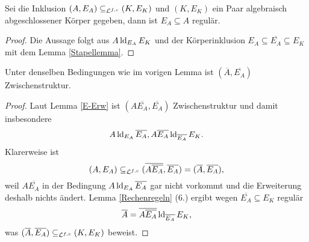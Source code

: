     \begin{lemma}
    	Sei die Inklusion $(A,E_A)\subseteq_{\mathcal{L}^{f,c}}(K,E_K)$ und $(K,E_K)$ ein Paar algebraisch abgeschlossener Körper gegeben, dann ist $E_A\subseteq A$ regulär.
    \end{lemma}
    \begin{proof}
    	Die Aussage folgt aus $A\operatorname{ld}_{E_A}E_K$ und der Körperinklusion $E_A\subseteq\overline{E_A}\subseteq E_K$ mit dem Lemma \ref{Stapellemma}.
    \end{proof}
    
    \begin{lemma}\label{alg Abschl}
    	Unter denselben Bedingungen wie im vorigen Lemma ist $(\overline{A},\overline{E_A})$ Zwischenstruktur.
    \end{lemma}
    \begin{proof}
    	Laut Lemma \ref{E-Erw} ist $(A\overline{E_A},\overline{E_A})$ Zwischenstruktur und damit insbesondere $$A\operatorname{ld}_{E_A}\overline{E_A},A\overline{E_A}\operatorname{ld}_{\overline{E_A}}E_K.$$ Klarerweise ist $$(A,E_A)\subseteq_{\mathcal{L}^{f,c}}(\overline{A\overline{E_A}},\overline{E_A})=(\overline{A},\overline{E_A}),$$ weil $A\overline{E_A}$ in der Bedingung $A\operatorname{ld}_{E_A}\overline{E_A}$ gar nicht vorkommt und die Erweiterung deshalb nichts ändert.\newpage
    	Lemma \ref{Rechenregeln} (6.) ergibt wegen $\overline{E_A}\subseteq E_K$ regulär $$\overline{A}=\overline{A\overline{E_A}}\operatorname{ld}_{\overline{E_A}}E_K,$$ was $(\overline{A},\overline{E_A})\subseteq_{\mathcal{L}^{f,c}}(K,E_K)$ beweist.
    \end{proof}
    
